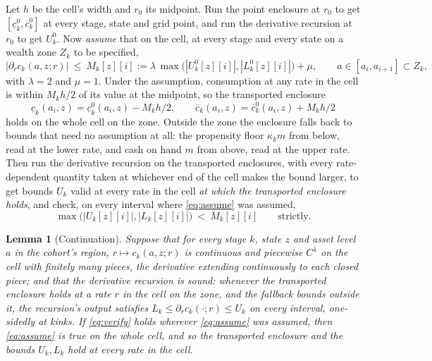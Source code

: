 \documentclass[11pt]{article}
\newtheorem{lemma}[theorem]{Lemma}
\theoremstyle{definition}
\theoremstyle{remark}
\begin{document}
Let $h$ be the cell's width and $r_0$ its midpoint. Run the point enclosure at $r_0$ to get
$[\underline c^0_k,\overline c^0_k]$ at every stage, state and grid point, and run the derivative
recursion at $r_0$ to get $U^0_k$. Now \emph{assume} that on the cell, at every stage and every
state on a wealth zone $Z_k$ to be specified,
\begin{equation}\label{eq:assume}
  |\partial_rc_k(a,z;r)|\ \le\ M_k[z][i]:=\lambda\,\max\bigl(|U^0_k[z][i]|,|L^0_k[z][i]|\bigr)+\mu,
  \qquad a\in[a_i,a_{i+1}]\subset Z_k,
\end{equation}
with $\lambda=2$ and $\mu=1$. Under the assumption, consumption at any rate in the cell is within
$M_kh/2$ of its value at the midpoint, so the transported enclosure
\[
  \underline c_k(a_i,z)=\underline c^0_k(a_i,z)-M_kh/2,\qquad
  \overline c_k(a_i,z)=\overline c^0_k(a_i,z)+M_kh/2
\]
holds on the whole cell on the zone. Outside the zone the enclosure falls back to bounds that need
no assumption at all: the propensity floor $\kappa_km$ from below, read at the lower rate, and cash
on hand $m$ from above, read at the upper rate. Then run the derivative recursion on the transported
enclosures, with every rate-dependent quantity taken at whichever end of the cell makes the bound
larger, to get bounds $U_k$ valid at every rate in the cell \emph{at which the transported
enclosure holds}, and check, on every interval where \eqref{eq:assume} was assumed,
\begin{equation}\label{eq:verify}
  \max\bigl(|U_k[z][i]|,|L_k[z][i]|\bigr)\ <\ M_k[z][i]\qquad\text{strictly.}
\end{equation}

\begin{lemma}[Continuation]\label{lem:cont}
Suppose that for every stage $k$, state $z$ and asset level $a$ in the cohort's region,
$r\mapsto c_k(a,z;r)$ is continuous and piecewise $C^1$ on the cell with finitely many pieces, the
derivative extending continuously to each closed piece; and that the derivative recursion is sound:
whenever the transported enclosure holds at a rate $r$ in the cell on the zone, and the fallback
bounds outside it, the recursion's output satisfies $L_k\le\partial_rc_k(\cdot;r)\le U_k$ on every
interval, one-sidedly at kinks. If \eqref{eq:verify} holds wherever \eqref{eq:assume} was assumed,
then \eqref{eq:assume} is true on the whole cell, and so the transported enclosure and the bounds
$U_k,L_k$ hold at every rate in the cell.
\end{lemma}
\end{document}
